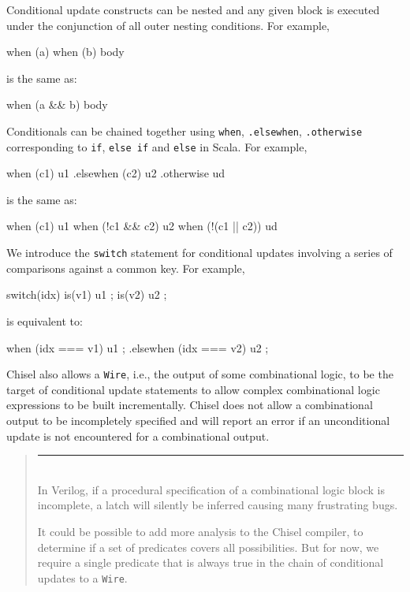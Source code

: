 \documentclass[10pt]{article}
\newenvironment{commentary}
{ \vspace{-0.1in}
  \begin{quotation}
  \noindent
  \small \em
  \rule{\linewidth}{1pt}\\
}
{
  \end{quotation}
}
\def\code#1{{\tt #1}}
\begin{document}
Conditional update constructs can be nested and any given block is
executed under the conjunction of all outer nesting conditions.  For
example,
\begin{scala}
when (a) { when (b) { body } }
\end{scala}

\noindent
is the same as:
\begin{scala}
when (a && b) { body }
\end{scala}

Conditionals can be chained together using
\verb+when+, \verb+.elsewhen+, \verb+.otherwise+ corresponding to
\verb+if+, \verb+else if+ and \verb+else+ in Scala.  For example,
\begin{scala}
when (c1) { u1 }
.elsewhen (c2) { u2 }
.otherwise { ud }
\end{scala}
\noindent
is the same as:
\begin{scala}
when (c1) { u1 }
when (!c1 && c2) { u2 }
when (!(c1 || c2)) { ud }
\end{scala}

We introduce the \code{switch} statement for conditional updates
involving a series of comparisons against a common key.  For example,
\begin{scala}
switch(idx) {
 is(v1) { u1 };
 is(v2) { u2 };
}
\end{scala}

\noindent
is equivalent to:
\begin{scala}
when (idx === v1) { u1 };
.elsewhen (idx === v2) { u2 };
\end{scala}

Chisel also allows a \code{Wire}, i.e., the output of some
combinational logic, to be the target of conditional update statements
to allow complex combinational logic expressions to be built
incrementally.  Chisel does not allow a combinational output to be
incompletely specified and will report an error if an unconditional
update is not encountered for a combinational output.
\begin{commentary}
In Verilog, if a procedural specification of a combinational logic
block is incomplete, a latch will silently be inferred causing many
frustrating bugs.

It could be possible to add more analysis to the Chisel compiler, to
determine if a set of predicates covers all possibilities.  But for
now, we require a single predicate that is always true in the
chain of conditional updates to a \code{Wire}.
\end{commentary}
\end{document}
